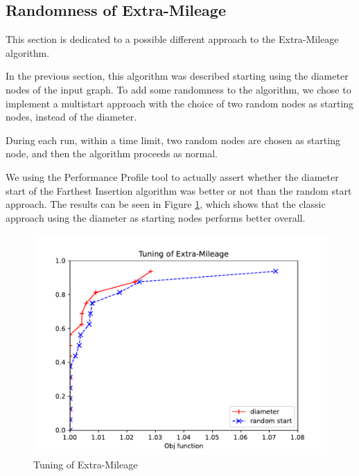 \subsection{Randomness of Extra-Mileage}
This section is dedicated to a possible different approach to the Extra-Mileage algorithm. 

In the previous section, this algorithm was described starting using the diameter nodes of the input graph. To add some randomness to the algorithm, we chose to implement a multistart approach with the choice of two random nodes as starting nodes, instead of the diameter.

During each run, within a time limit, two random nodes are chosen as starting node, and then the algorithm proceeds as normal. 

We using the Performance Profile tool to actually assert whether the diameter start of the Farthest Insertion algorithm was better or not than the random start approach. The results can be seen in Figure \ref*{fig:extra}, which shows that the classic approach using the diameter as starting nodes performs better overall.

\begin{figure}[!h]
    \centering
    \includegraphics[width=\textwidth]{images/extra.pdf}
    \caption{Tuning of Extra-Mileage}
    \label{fig:extra}
\end{figure}
